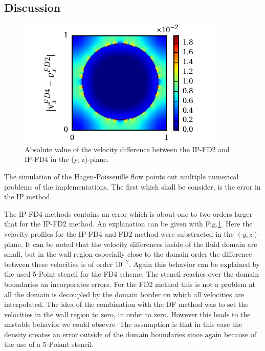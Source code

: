\clearpage

\subsection{Discussion}

\begin{figure}[!bp]
  \begin{minipage}[c]{0.4\textwidth}
      \centering
      \includegraphics{gfx/immersed_boundary/hpflow/discussion/vzdiff.pdf}
  \end{minipage}
  \begin{minipage}[c]{0.6\textwidth}
      \caption{Absolute value of the velocity difference between the IP-FD2 and IP-FD4 in the (y, z)-plane.
      \label{valid:hpflow_velodiff_discussion}
      }
  \end{minipage}
\end{figure}

The simulation of the Hagen-Poisseuille flow points out multiple numerical problems of the
implementations.
The first which shall be consider, is the error in the IP method.

The IP-FD4 methods contains an error which is about one to two orders larger that for the IP-FD2 method.
An explanation can be given with Fig.\ref{valid:hpflow_velodiff_discussion}.
Here the velocity profiles for the IP-FD4 and FD2 method were substracted in the $(y, z)$-plane.
It can be noted that the velocity differences inside of the fluid domain are small, but in the wall region
especially close to the domain order the difference between these velocities is of order $10^{-2}$.
Again this behavior can be explained by the used 5-Point stencil for the FD4 scheme.
The stencil reaches over the domain boundaries an incorporates errors.
For the FD2 method this is not a problem at all the domain is decoupled by the domain border on which all
velocities are interpolated.
The idea of the combination with the DF method was to set the velocities in the wall region to zero,
in order to zero. However this leads to the unstable behavior we could obsevre.
The assumption is that in this case the density creates an error outside of the domain boundaries since
again because of the use of a 5-Poiant stencil.

